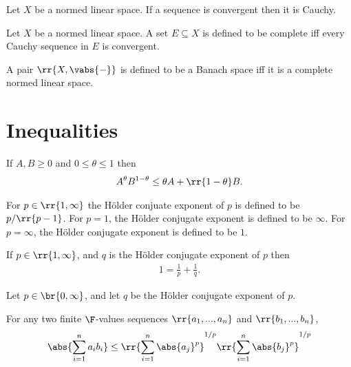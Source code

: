 \documentclass{article}
\begin{document}
\begin{theorem}
	\label{thm:convergent-implies-cauchy}
	Let $X$ be a normed linear space. If a sequence is convergent then it is Cauchy.
\end{theorem}


\begin{definition}
	\label{def:complete}
	Let $X$ be a normed linear space. A set $E\subseteq X$ is defined to be complete iff every Cauchy
	sequence in $E$ is convergent.
\end{definition}


\begin{definition}
	\label{def:banach}
	A pair $ \rr{ X, \vabs{ - } } $ is defined to be a Banach space iff it is a complete normed linear space.
\end{definition}


\section{Inequalities}
\label{sec:ineqaulities}


\begin{theorem}
	\label{thm:gagm}
	If $A,B\geq 0$ and $0\leq\theta\leq 1$ then
	\begin{align*}
		A^\theta B^{1-\theta} \leq \theta A + \rr{ 1-\theta }B.
	\end{align*}
\end{theorem}

\begin{definition}
	\label{def:holder-conjugate-exponent}
	For $p\in \rr{ 1,\infty }$ the H\"older conjuate exponent of $p$ is defined to be $p/ \rr{ p-1 }$.
	For $p=1$, the H\"older conjugate exponent is defined to be $\infty$. For $p=\infty$, the
	H\"older conjugate exponent is defined to be $1$.
\end{definition}

\begin{theorem}
	\label{thm:hce-equals-one}
	If $p\in \rr{ 1,\infty }$, and $q$ is the H\"older conjugate exponent of $p$ then
	\begin{align*}
		1 = \frac{1}{p} + \frac{1}{q}.
	\end{align*}
\end{theorem}


\begin{theorem}
	\label{thm:holder-inequality-finite}
	Let $p\in \br{ 0,\infty }$, and let $q$ be the H\"older conjugate exponent of $p$.

	For any two finite $\F$-values sequences $ \rr{ a_1, ..., a_n }$ and $ \rr{ b_1, ..., b_n }$,
	\begin{align*}
		\abs{\sum_{i=1}^n a_i b_i}
		\leq \rr{ \sum_{i=1}^n \abs{a_j}^p }^{1/p} \rr{ \sum_{i=1}^n \abs{b_j}^p }^{1/p}
	\end{align*}
\end{theorem}
\end{document}
